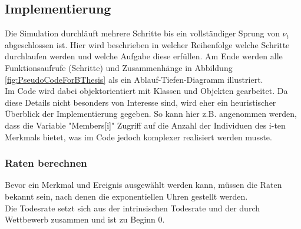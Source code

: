\documentclass[11pt, a4paper, german]{article}
\theoremstyle{plain}
\begin{document}
	\subsection{Implementierung}
	Die Simulation durchläuft mehrere Schritte bis ein vollständiger Sprung von $ \nu_t $ abgeschlossen ist. Hier wird beschrieben in welcher Reihenfolge welche Schritte durchlaufen werden und welche Aufgabe diese erfüllen. Am Ende werden alle Funktionsaufrufe (Schritte) und Zusammenhänge in Abbildung \ref{fig:PseudoCodeForBThesis} als ein Ablauf-Tiefen-Diagramm illustriert.\\
	Im Code wird dabei objektorientiert mit Klassen und Objekten gearbeitet. Da diese Details nicht besonders von Interesse sind, wird eher ein heuristischer Überblick der Implementierung gegeben. So kann hier z.B. angenommen werden, dass die Variable "{}Members[i]"{} Zugriff auf die Anzahl der Individuen des i-ten Merkmals bietet, was im Code jedoch komplexer realisiert werden musste.\\
	
	\subsubsection{Raten berechnen}	
	Bevor ein Merkmal und Ereignis ausgewählt werden kann, müssen die Raten bekannt sein, nach denen die exponentiellen Uhren gestellt werden.\\
	Die Todesrate setzt sich aus der intrinsischen Todesrate und der durch Wettbewerb zusammen und ist zu Beginn 0.\\
	
\end{document}
